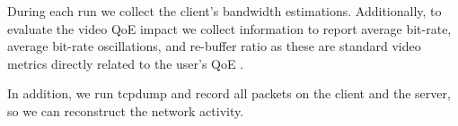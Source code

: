 \documentclass[10pt,sigconf,anonymous]{acmart}
\begin{document}
During each run we collect the client's bandwidth estimations. Additionally, to evaluate the video QoE impact we collect information to report average bit-rate, average bit-rate oscillations, and re-buffer ratio as these are standard video metrics directly related to the user's QoE \cite{Spiteri-2019-from-theory-to-practice-sabre, Yin-2015-a-control-theoritic-approach, Dobrian-2013-understanding-the-impact-of-video-quality}.

In addition, we run tcpdump and record all packets on the client and the server, so we can reconstruct the network activity.





\end{document}
